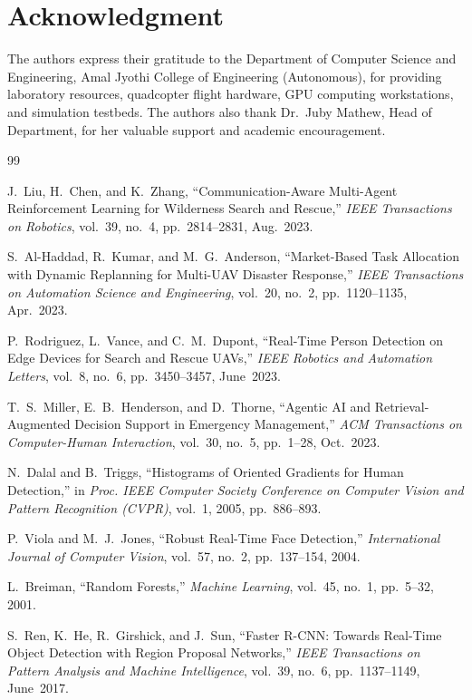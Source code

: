 \documentclass[journal]{IEEEtran}
\begin{document}
\section*{Acknowledgment}
The authors express their gratitude to the Department of Computer Science and Engineering, Amal Jyothi College of Engineering (Autonomous), for providing laboratory resources, quadcopter flight hardware, GPU computing workstations, and simulation testbeds. The authors also thank Dr.~Juby Mathew, Head of Department, for her valuable support and academic encouragement.

\begin{thebibliography}{99}

 J.~Liu, H.~Chen, and K.~Zhang, ``Communication-Aware Multi-Agent Reinforcement Learning for Wilderness Search and Rescue,'' \textit{IEEE Transactions on Robotics}, vol.~39, no.~4, pp.~2814--2831, Aug.~2023.

 S.~Al-Haddad, R.~Kumar, and M.~G.~Anderson, ``Market-Based Task Allocation with Dynamic Replanning for Multi-UAV Disaster Response,'' \textit{IEEE Transactions on Automation Science and Engineering}, vol.~20, no.~2, pp.~1120--1135, Apr.~2023.

 P.~Rodriguez, L.~Vance, and C.~M.~Dupont, ``Real-Time Person Detection on Edge Devices for Search and Rescue UAVs,'' \textit{IEEE Robotics and Automation Letters}, vol.~8, no.~6, pp.~3450--3457, June~2023.

 T.~S.~Miller, E.~B.~Henderson, and D.~Thorne, ``Agentic AI and Retrieval-Augmented Decision Support in Emergency Management,'' \textit{ACM Transactions on Computer-Human Interaction}, vol.~30, no.~5, pp.~1--28, Oct.~2023.

 N.~Dalal and B.~Triggs, ``Histograms of Oriented Gradients for Human Detection,'' in \textit{Proc. IEEE Computer Society Conference on Computer Vision and Pattern Recognition (CVPR)}, vol.~1, 2005, pp.~886--893.

 P.~Viola and M.~J.~Jones, ``Robust Real-Time Face Detection,'' \textit{International Journal of Computer Vision}, vol.~57, no.~2, pp.~137--154, 2004.

 L.~Breiman, ``Random Forests,'' \textit{Machine Learning}, vol.~45, no.~1, pp.~5--32, 2001.

 S.~Ren, K.~He, R.~Girshick, and J.~Sun, ``Faster R-CNN: Towards Real-Time Object Detection with Region Proposal Networks,'' \textit{IEEE Transactions on Pattern Analysis and Machine Intelligence}, vol.~39, no.~6, pp.~1137--1149, June~2017.


\end{thebibliography}
\end{document}
